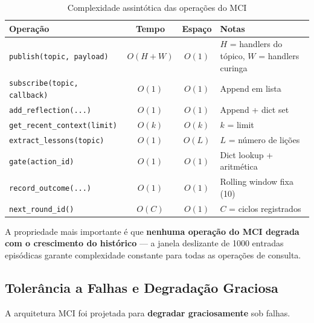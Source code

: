 \begin{table}[htbp]
\centering
\caption{Complexidade assintótica das operações do MCI}
\label{tab:complexity-mci}
\begin{tabular}{@{}p{6cm}ccp{4cm}@{}}
\toprule
\textbf{Operação} & \textbf{Tempo} & \textbf{Espaço} & \textbf{Notas} \\
\midrule
\texttt{publish(topic, payload)} & $O(H + W)$ & $O(1)$ & $H$ = handlers do tópico, $W$ = handlers curinga \\
\texttt{subscribe(topic, callback)} & $O(1)$ & $O(1)$ & Append em lista \\
\texttt{add\_reflection(...)} & $O(1)$ & $O(1)$ & Append + dict set \\
\texttt{get\_recent\_context(limit)} & $O(k)$ & $O(k)$ & $k$ = limit \\
\texttt{extract\_lessons(topic)} & $O(1)$ & $O(L)$ & $L$ = número de lições \\
\texttt{gate(action\_id)} & $O(1)$ & $O(1)$ & Dict lookup + aritmética \\
\texttt{record\_outcome(...)} & $O(1)$ & $O(1)$ & Rolling window fixa (10) \\
\texttt{next\_round\_id()} & $O(C)$ & $O(1)$ & $C$ = ciclos registrados \\
\bottomrule
\end{tabular}
\end{table}

A propriedade mais importante é que \textbf{nenhuma operação do MCI degrada com o crescimento do histórico} — a janela deslizante de 1000 entradas episódicas garante complexidade constante para todas as operações de consulta.

\subsection{Tolerância a Falhas e Degradação Graciosa}

A arquitetura MCI foi projetada para \textbf{degradar graciosamente} sob falhas.

